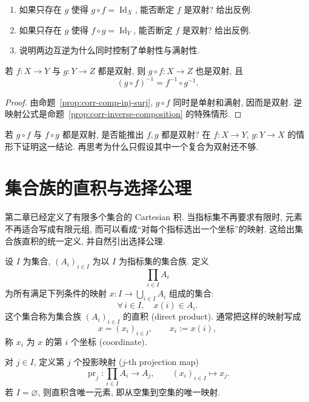 \documentclass[usesamecnt, thmcnt=section, lang=cn, newtx, 10pt, scheme=chinese]{elegantbook}
\begin{document}
\begin{exercise}\label{ex:corr-bijection-inverse}
\begin{enumerate}[label=\rm(\arabic*)]
  \item 如果只存在 $g$ 使得 $g\circ f=\operatorname{Id}_X$, 能否断定 $f$ 是双射? 给出反例.
  \item 如果只存在 $g$ 使得 $f\circ g=\operatorname{Id}_Y$, 能否断定 $f$ 是双射? 给出反例.
  \item 说明两边互逆为什么同时控制了单射性与满射性.
\end{enumerate}
\end{exercise}

\begin{proposition}\label{prop:corr-composite-bijection}
若 $f:X\to Y$ 与 $g:Y\to Z$ 都是双射, 则 $g\circ f:X\to Z$ 也是双射, 且
\[
 (g\circ f)^{-1}=f^{-1}\circ g^{-1}.
\]
\end{proposition}

\begin{proof}
由命题~\ref{prop:corr-comp-inj-surj}, $g\circ f$ 同时是单射和满射, 因而是双射. 逆映射公式是命题~\ref{prop:corr-inverse-composition} 的特殊情形.
\end{proof}

\begin{exercise}\label{ex:corr-composite-bijection}
若 $g\circ f$ 与 $f\circ g$ 都是双射, 是否能推出 $f,g$ 都是双射? 在 $f:X\to Y$, $g:Y\to X$ 的情形下证明这一结论. 再思考为什么只假设其中一个复合为双射还不够.
\end{exercise}

\section{集合族的直积与选择公理}

第二章已经定义了有限多个集合的 Cartesian 积. 当指标集不再要求有限时, 元素不再适合写成有限元组, 而可以看成``对每个指标选出一个坐标''的映射. 这给出集合族直积的统一定义, 并自然引出选择公理.

\begin{definition}[集合族的直积]\label{def:corr-direct-product}
设 $I$ 为集合, $(A_i)_{i\in I}$ 为以 $I$ 为指标集的集合族. 定义
\[
 \prod_{i\in I}A_i
\]
为所有满足下列条件的映射 $x:I\to\bigcup_{i\in I}A_i$ 组成的集合:
\[
 \forall\,i\in I,\quad x(i)\in A_i.
\]
这个集合称为集合族 $(A_i)_{i\in I}$ 的{\color{blue}直积 (direct product)}.
通常把这样的映射写成
\[
 x=(x_i)_{i\in I},
 \qquad x_i:=x(i),
\]
称 $x_i$ 为 $x$ 的第 $i$ 个{\color{blue}坐标 (coordinate)}.

对 $j\in I$, 定义{\color{blue}第 $j$ 个投影映射 ($j$-th projection map)}
\[
 \operatorname{pr}_j:\prod_{i\in I}A_i\longrightarrow A_j,
 \qquad
 (x_i)_{i\in I}\longmapsto x_j.
\]
若 $I=\varnothing$, 则直积含唯一元素, 即从空集到空集的唯一映射.
\end{definition}
\end{document}
